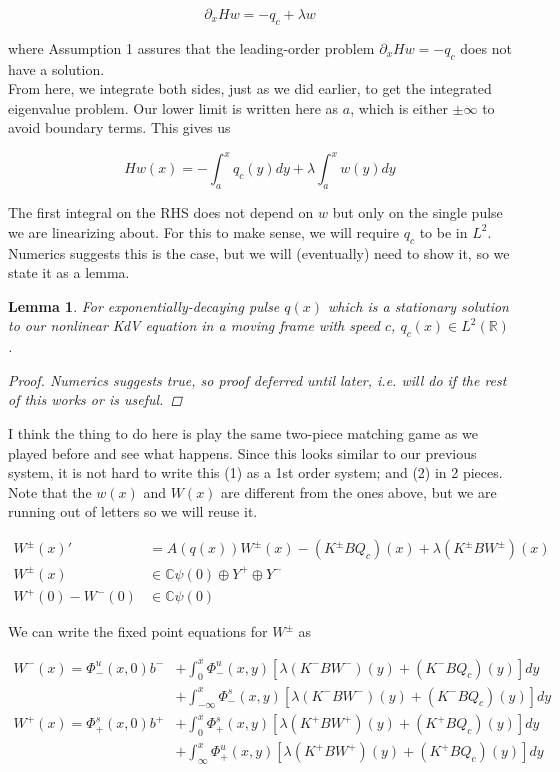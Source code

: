 \documentclass[12pt]{article}
\def\R{{\mathbb R}}
\def\C{{\mathbb C}}
\newtheorem{lemma}{Lemma}
\begin{document}
\[
\partial_x H w = -q_c + \lambda w 
\]

where Assumption 1 assures that the leading-order problem $\partial_x H w = -q_c$ does not have a solution.\\

From here, we integrate both sides, just as we did earlier, to get the integrated eigenvalue problem. Our lower limit is written here as $a$, which is either $\pm \infty$ to avoid boundary terms. This gives us

\[
H w(x) = -\int_a^x q_c(y) dy + \lambda \int_a^x w(y) dy 
\]

The first integral on the RHS does not depend on $w$ but only on the single pulse we are linearizing about. For this to make sense, we will require $q_c$ to be in $L^2$. Numerics suggests this is the case, but we will (eventually) need to show it, so we state it as a lemma.

\begin{lemma}For exponentially-decaying pulse $q(x)$ which is a stationary solution to our nonlinear KdV equation in a moving frame with speed $c$, $q_c(x) \in L^2(\R)$.
\begin{proof}Numerics suggests true, so proof deferred until later, i.e. will do if the rest of this works or is useful.
\end{proof} 
\end{lemma}

I think the thing to do here is play the same two-piece matching game as we played before and see what happens. Since this looks similar to our previous system, it is not hard to write this (1) as a 1st order system; and (2) in 2 pieces. Note that the $w(x)$ and $W(x)$ are different from the ones above, but we are running out of letters so we will reuse it.

\begin{align*}
W^\pm(x)' &= A(q(x)) W^\pm(x) - (K^\pm B Q_c)(x) + \lambda (K^\pm B W^\pm)(x) \\
W^\pm(x) &\in \C \psi(0) \oplus Y^+ \oplus Y^- \\
W^+(0) - W^-(0) &\in \C \psi(0) 
\end{align*}

We can write the fixed point equations for $W^\pm$ as

\begin{align*}
W^-(x) = \Phi^u_-(x, 0)b^- &+ \int_0^x \Phi^u_-(x, y)[\lambda (K^- B W^-)(y) + (K^- B Q_c)(y) ] dy \\
&+ \int_{-\infty}^x \Phi^s_-(x, y)[\lambda (K^- B W^-)(y) + (K^- B Q_c)(y) ] dy \\
W^+(x) = \Phi^s_+(x, 0)b^+ &+ \int_0^x \Phi^s_+(x, y)[\lambda (K^+ B W^+)(y) + (K^+ B Q_c)(y) ] dy \\
&+ \int_{\infty}^x \Phi^u_+(x, y)[\lambda (K^+ B W^+)(y) + (K^+ B Q_c)(y) ] dy
\end{align*}
\end{document}
